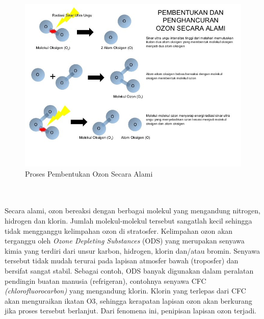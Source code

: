 \begin{figure}[h!]
    \centering
    \includegraphics[scale=0.7]{src/Pics/PROSES PEMBENTUKAN OZON SECARA ALAMI.jpg}
    \caption{Proses Pembentukan Ozon Secara Alami}
    \label{fig:my_label}
\end{figure}\\~\\
Secara alami, ozon bereaksi dengan berbagai molekul yang mengandung nitrogen, hidrogen dan klorin. Jumlah molekul-molekul tersebut sangatlah kecil sehingga tidak mengganggu kelimpahan ozon di stratosfer. 
Kelimpahan ozon akan terganggu oleh \textit{Ozone Depleting Substances} (ODS) yang merupakan senyawa kimia yang terdiri dari unsur karbon, hidrogen, klorin dan/atau bromin.  Senyawa tersebut tidak mudah terurai pada lapisan atmosfer bawah (troposfer) dan bersifat sangat stabil. Sebagai contoh, ODS banyak digunakan dalam peralatan pendingin buatan manusia (refrigeran), contohnya senyawa CFC \textit{(chlorofluorocarbon)} yang mengandung klorin. Klorin yang terlepas dari CFC akan menguraikan ikatan O3, sehingga kerapatan lapisan ozon akan berkurang jika proses tersebut berlanjut. Dari fenomena ini, penipisan lapisan ozon terjadi.
